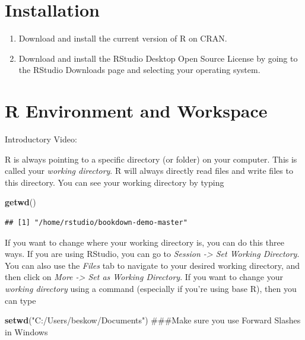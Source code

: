 \documentclass[]{book}
\newenvironment{Shaded}{\begin{snugshade}}{\end{snugshade}}
\newcommand{\KeywordTok}[1]{\textcolor[rgb]{0.13,0.29,0.53}{\textbf{{#1}}}}
\newcommand{\StringTok}[1]{\textcolor[rgb]{0.31,0.60,0.02}{{#1}}}
\newcommand{\NormalTok}[1]{{#1}}
\begin{document}
\section{Installation}\label{installation}

\begin{enumerate}
\def\labelenumi{\arabic{enumi}.}
\item
  Download and install the current version of R on CRAN.
\item
  Download and install the RStudio Desktop Open Source License by going
  to the RStudio Downloads page and selecting your operating system.
\end{enumerate}

\section{R Environment and Workspace}\label{r-environment-and-workspace}

Introductory Video:

R is always pointing to a specific directory (or folder) on your
computer. This is called your \emph{working directory}. R will always
directly read files and write files to this directory. You can see your
working directory by typing

\begin{Shaded}
\begin{Highlighting}[]
\KeywordTok{getwd}\NormalTok{()}
\end{Highlighting}
\end{Shaded}

\begin{verbatim}
## [1] "/home/rstudio/bookdown-demo-master"
\end{verbatim}

If you want to change where your working directory is, you can do this
three ways. If you are using RStudio, you can go to \emph{Session
-\textgreater{} Set Working Directory}. You can also use the
\emph{Files} tab to navigate to your desired working directory, and then
click on \emph{More -\textgreater{} Set as Working Directory}. If you
want to change your \emph{working directory} using a command (especially
if you're using base R), then you can type

\begin{Shaded}
\begin{Highlighting}[]
\KeywordTok{setwd}\NormalTok{(}\StringTok{"C:/Users/beskow/Documents"}\NormalTok{)  ###Make sure you use Forward Slashes in Windows}
\end{Highlighting}
\end{Shaded}
\end{document}
